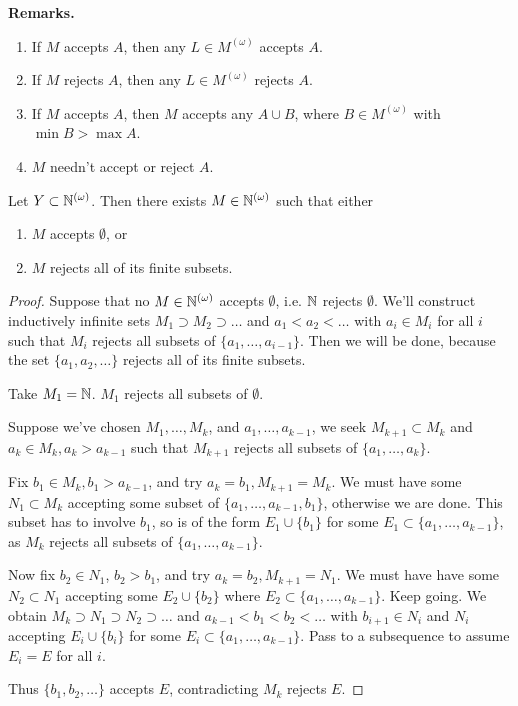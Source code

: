 \documentclass[10pt,a4paper]{article}
\begin{document}
\textbf{Remarks.}
\begin{enumerate}
  \item If $M$ accepts $A$, then any $L \in M^{(\omega)}$ accepts $A$.
  \item If $M$ rejects $A$, then any $L \in M^{(\omega)}$ rejects $A$.
  \item If $M$ accepts $A$, then $M$ accepts any $A\cup B$, where $B \in M^{(\omega)}$ with $\min B > \max A$.
  \item $M$ needn't accept or reject $A$.
\end{enumerate}
\begin{lemma}
  Let $Y \subset \mathbb{N}^{(\omega)}$. Then there exists $M \in \mathbb{N}^{(\omega)}$ such that either
  \begin{enumerate}
    \item $M$ accepts $\emptyset$, or
    \item $M$ rejects all of its finite subsets.
  \end{enumerate}
\end{lemma}
\begin{proof}
  Suppose that no $M \in \mathbb{N}^{(\omega)}$ accepts $\emptyset$, i.e. $\mathbb{N}$ rejects $\emptyset$. We'll construct inductively infinite sets $M_1 \supset M_2 \supset \ldots$ and $a_1 < a_2 < \ldots$ with $a_i \in M_i$ for all $i$ such that $M_i$ rejects all subsets of $\{a_1, \ldots, a_{i-1}\}$. Then we will be done, because the set $\{a_1, a_2, \ldots\}$ rejects all of its finite subsets.

  Take $M_1 = \mathbb{N}$. $M_1$ rejects all subsets of $\emptyset$.

  Suppose we've chosen $M_1, \ldots, M_k$, and $a_1, \ldots, a_{k-1}$, we seek $M_{k+1} \subset M_k$ and $a_k \in M_k, a_k > a_{k-1}$ such that $M_{k+1}$ rejects all subsets of $\{a_1, \ldots, a_k\}$.

  Fix $b_1 \in M_k, b_1 > a_{k-1}$, and try $a_k = b_1, M_{k+1} = M_k$. We must have some $N_1 \subset M_k$ accepting some subset of $\{a_1, \ldots, a_{k-1}, b_1\}$, otherwise we are done. This subset has to involve $b_1$, so is of the form $E_1 \cup \{b_1\}$ for some $E_1 \subset \{a_1, \ldots, a_{k-1}\}$, as $M_k$ rejects all subsets of $\{a_1, \ldots, a_{k-1}\}$.

  Now fix $b_2 \in N_1$, $b_2 > b_1$, and try $a_k = b_2, M_{k+1} = N_1$. We must have have some $N_2 \subset N_1$ accepting some $E_2 \cup \{b_2\}$ where $E_2 \subset \{a_1, \ldots, a_{k-1}\}$. Keep going. We obtain $M_k \supset N_1 \supset N_2 \supset \ldots$ and $a_{k-1} < b_1<b_2<\ldots$ with $b_{i+1} \in N_i$ and $N_i$ accepting $E_i \cup \{b_i\}$ for some $E_i \subset \{a_1, \ldots, a_{k-1}\}$. Pass to a subsequence to assume $E_i = E$ for all $i$.

  Thus $\{b_1, b_2, \ldots\}$ accepts $E$, contradicting $M_k$ rejects $E$.
\end{proof}
\end{document}
